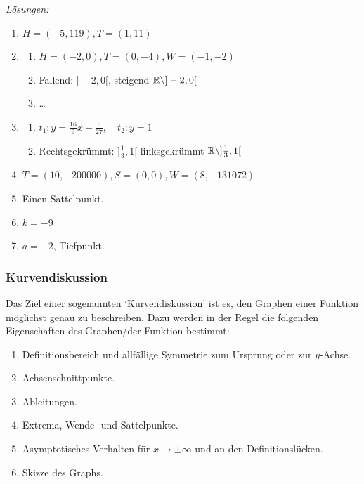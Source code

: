 \clearpage
\emph{Lösungen:}
\begin{enumerate}
    \item $H=(-5, 119), T=(1,11)$
    \item \begin{enumerate}
        \item $H=(-2, 0), T=(0, -4), W=(-1, -2)$
        \item Fallend: $]-2, 0[$, steigend $\mathbb{R} \setminus ]-2, 0[$
        \item \dots
    \end{enumerate}
    \item \begin{enumerate}
            \item $t_1: y= \frac{16}{9}x -\frac{5}{27}, \quad t_2: y=1$
            \item Rechtsgekrümmt: $]\frac{1}{3}, 1[$ linksgekrümmt $\mathbb{R} \setminus ]\frac{1}{3}, 1[$
            \end{enumerate}
    
    \item $T=(10, -200000), S =(0,0), W=(8, -131072)$
        \item Einen Sattelpunkt.
    \item $k= -9$
    \item $a=-2$, Tiefpunkt.

\end{enumerate}
































\clearpage
\subsubsection{Kurvendiskussion}
Das Ziel einer sogenannten `Kurvendiskussion' ist es, den Graphen einer Funktion möglichst genau zu beschreiben. Dazu werden in der Regel die folgenden Eigenschaften des Graphen/der Funktion bestimmt:
\begin{enumerate}
    \item Definitionsbereich und allfällige Symmetrie zum Ursprung oder zur $y$-Achse.
    \item Achsenschnittpunkte.
    \item Ableitungen.
    \item Extrema, Wende- und Sattelpunkte.
    \item Asymptotisches Verhalten für $x\to\pm\infty$ und an den Definitionslücken.
    \item Skizze des Graphs.
\end{enumerate}

